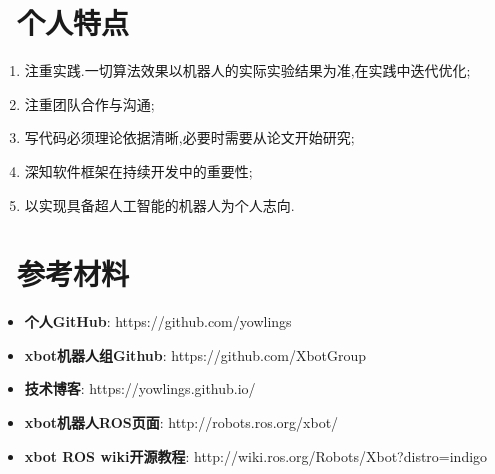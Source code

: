 \documentclass{resume}
\begin{document}
\section{\faCommenting\ 个人特点}
\begin{enumerate}
  \item 注重实践.一切算法效果以机器人的实际实验结果为准,在实践中迭代优化;
  \item 注重团队合作与沟通;
  \item 写代码必须理论依据清晰,必要时需要从论文开始研究;
  \item 深知软件框架在持续开发中的重要性;
  \item 以实现具备超人工智能的机器人为个人志向.
\end{enumerate}
\section{\faInfoCircle\ 参考材料}
\begin{itemize}[parsep=0.5ex]
  \item \textbf{个人GitHub}: https://github.com/yowlings
  \item \textbf{xbot机器人组Github}: https://github.com/XbotGroup
  \item \textbf{技术博客}: https://yowlings.github.io/
  \item \textbf{xbot机器人ROS页面}: http://robots.ros.org/xbot/
  \item \textbf{xbot ROS wiki开源教程}: http://wiki.ros.org/Robots/Xbot?distro=indigo
\end{itemize}

% 
\end{document}
